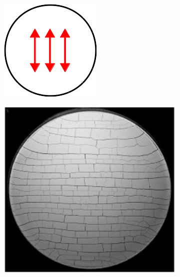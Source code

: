 \begin{figure}[htb!]
  \begin{subfigure}{0.14\textwidth}
    \includegraphics[width=\textwidth]{Chapter4/figures/2D/brick_schematic.png}
    \caption{}
  \end{subfigure}
  \hspace{0.02\textwidth}
  \begin{subfigure}{0.14\textwidth}
    \includegraphics[width=\textwidth]{Chapter4/figures/2D/paste_brick.png}

\end{subfigure}
\end{figure}
